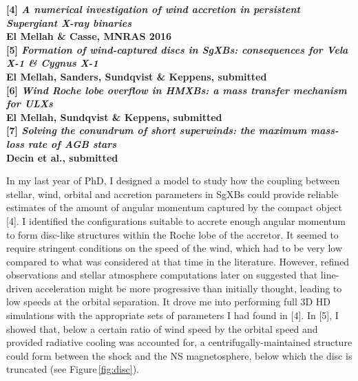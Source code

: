\documentclass[letterpaper,12pt,onecolumn]{article}
\makeatletter
\newcommand{\sgxs}{SgXBs\xspace}
\newcommand*{\hmxb}{HMXB\@\xspace}
\newcommand*{\ns}{NS\@\xspace}
\makeatother
\begin{document}
\footnotesize
\textbf{[4] \textit{A numerical investigation of wind accretion in persistent Supergiant X-ray binaries}}\\
\hspace*{16pt}\textbf{El Mellah \& Casse, MNRAS 2016}\\
\textbf{[5] \textit{Formation of wind-captured discs in SgXBs: consequences for Vela X-1 \& Cygnus X-1}}\\
\hspace*{16pt}\textbf{El Mellah, Sanders, Sundqvist \& Keppens, submitted}\\
\textbf{[6] \textit{Wind Roche lobe overflow in HMXBs: a mass transfer mechanism for ULXs}}\\
\hspace*{16pt}\textbf{El Mellah, Sundqvist \& Keppens, submitted}\\
\textbf{[7] \textit{Solving the conundrum of short superwinds: the maximum mass-loss rate of AGB stars}}\\
\hspace*{16pt}\textbf{Decin et al., submitted}\\

\normalsize


In my last year of PhD, I designed a model to study how the coupling between stellar, wind, orbital and accretion parameters in \sgxs could provide reliable estimates of the amount of angular momentum captured by the compact object [4]. I identified the configurations suitable to accrete enough angular momentum to form disc-like structures within the Roche lobe of the accretor. It seemed to require stringent conditions on the speed of the wind, which had to be very low compared to what was considered at that time in the literature. However, refined observations and stellar atmosphere computations later on suggested that line-driven acceleration might be more progressive than initially thought, leading to low speeds at the orbital separation. It drove me into performing full 3D HD simulations with the appropriate sets of parameters I had found in [4]. In [5], I showed that, below a certain ratio of wind speed by the orbital speed and provided radiative cooling was accounted for, a centrifugally-maintained structure could form between the shock and the \ns magnetosphere, below which the disc is truncated (see Figure\,\ref{fig:disc}). 
\end{document}
